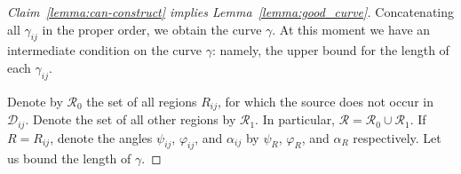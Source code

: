 \begin{proof}[Claim~\ref{lemma:can-construct} implies Lemma~\ref{lemma:good_curve}]
Concatenating all $\gamma_{ij}$ in the proper order, we obtain the curve $\gamma$. At this moment we have an intermediate condition on the curve $\gamma$: namely, the upper bound for the length of each $\gamma_{ij}$. %


%
Denote by $\mathcal{R}_0$ the set of all regions $R_{ij}$, for which the source does not occur in $\mathcal{D}_{ij}$. Denote the set of all other regions by $\mathcal{R}_1$. In particular, $\mathcal{R} = \mathcal{R}_0\cup\mathcal{R}_1$. If $R = R_{ij}$, denote the angles $\psi_{ij}$, $\varphi_{ij}$, and $\alpha_{ij}$ by $\psi_R$, $\varphi_R$, and $\alpha_R$ respectively. Let us bound the length of $\gamma$.



\end{proof}

